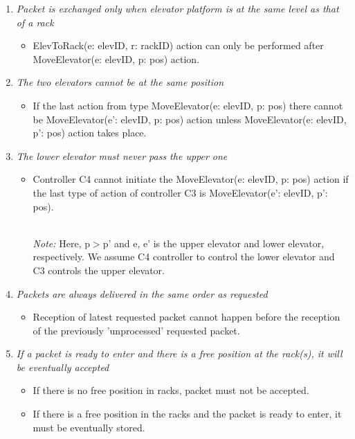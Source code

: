 \begin{enumerate}
\item \textit{Packet is exchanged only when elevator platform is at the same level as that of a rack}
	\begin{itemize}
	\item ElevToRack(e: elevID, r: rackID) action can only be performed after
	MoveElevator(e: elevID, p: pos) action.
	\end{itemize}
	
\item \textit{The two elevators cannot be at the same position}
	\begin{itemize}
	\item If the last action from type MoveElevator(e: elevID, p: pos)
	there cannot be MoveElevator(e': elevID, p: pos) action unless 
	MoveElevator(e: elevID, p': pos) action takes place.
	

	\end{itemize}
		
\item \textit{The lower elevator must never pass the upper one}
	\begin{itemize}
	\item Controller C4 cannot initiate the MoveElevator(e: elevID, p: pos) 
	action if the last type of action of controller C3 is MoveElevator(e': elevID, p': pos).
	
	
	\\
	\textit{Note:} Here, p$>$p' and e, e' is the upper elevator and 
	lower elevator, respectively. We assume C4 controller to control
	the lower elevator and C3 controls the upper elevator.
	\end{itemize}
	
	
\item \textit{Packets are always delivered in the same order as
	requested}	
	\begin{itemize}
	\item Reception of latest requested packet cannot happen before
	the reception of the previously 'unprocessed' requested packet.
	\end{itemize}
	
\item \textit{If a packet is ready to enter and there is a free
	position at the rack(s), it will be eventually accepted}
	\begin{itemize}
	\item If there is no free position in racks, packet must not be 
	accepted.
	\item If there is a free position in the racks and the packet is 
	ready to enter, it must be eventually stored.
	\end{itemize}
	

\end{enumerate}
